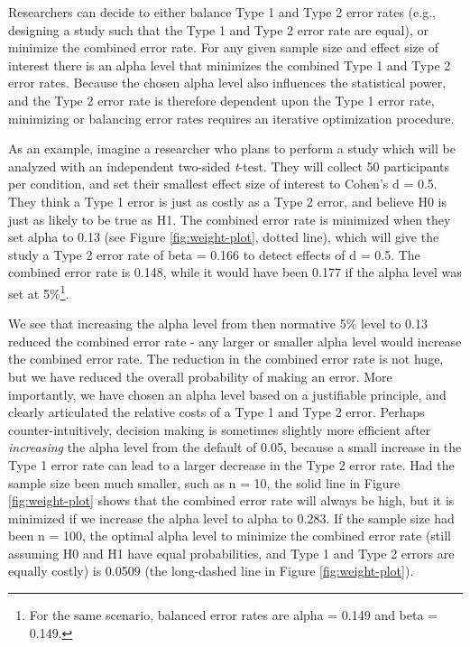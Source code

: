 \documentclass[
  english,
  ,jou, a4paper,floatsintext]{apa6}
\begin{document}
Researchers can decide to either balance Type 1 and Type 2 error rates (e.g., designing a study such that the Type 1 and Type 2 error rate are equal), or minimize the combined error rate. For any given sample size and effect size of interest there is an alpha level that minimizes the combined Type 1 and Type 2 error rates. Because the chosen alpha level also influences the statistical power, and the Type 2 error rate is therefore dependent upon the Type 1 error rate, minimizing or balancing error rates requires an iterative optimization procedure.

As an example, imagine a researcher who plans to perform a study which will be analyzed with an independent two-sided \emph{t}-test. They will collect 50 participants per condition, and set their smallest effect size of interest to Cohen's d = 0.5. They think a Type 1 error is just as costly as a Type 2 error, and believe H0 is just as likely to be true as H1. The combined error rate is minimized when they set alpha to 0.13 (see Figure \ref{fig:weight-plot}, dotted line), which will give the study a Type 2 error rate of beta = 0.166 to detect effects of d = 0.5. The combined error rate is 0.148, while it would have been 0.177 if the alpha level was set at 5\%\footnote{For the same scenario, balanced error rates are alpha = 0.149 and beta = 0.149.}.

We see that increasing the alpha level from then normative 5\% level to 0.13 reduced the combined error rate - any larger or smaller alpha level would increase the combined error rate. The reduction in the combined error rate is not huge, but we have reduced the overall probability of making an error. More importantly, we have chosen an alpha level based on a justifiable principle, and clearly articulated the relative costs of a Type 1 and Type 2 error. Perhaps counter-intuitively, decision making is sometimes slightly more efficient after \emph{increasing} the alpha level from the default of 0.05, because a small increase in the Type 1 error rate can lead to a larger decrease in the Type 2 error rate. Had the sample size been much smaller, such as n = 10, the solid line in Figure \ref{fig:weight-plot} shows that the combined error rate will always be high, but it is minimized if we increase the alpha level to alpha to 0.283. If the sample size had been n = 100, the optimal alpha level to minimize the combined error rate (still assuming H0 and H1 have equal probabilities, and Type 1 and Type 2 errors are equally costly) is 0.0509 (the long-dashed line in Figure \ref{fig:weight-plot}).
\end{document}
